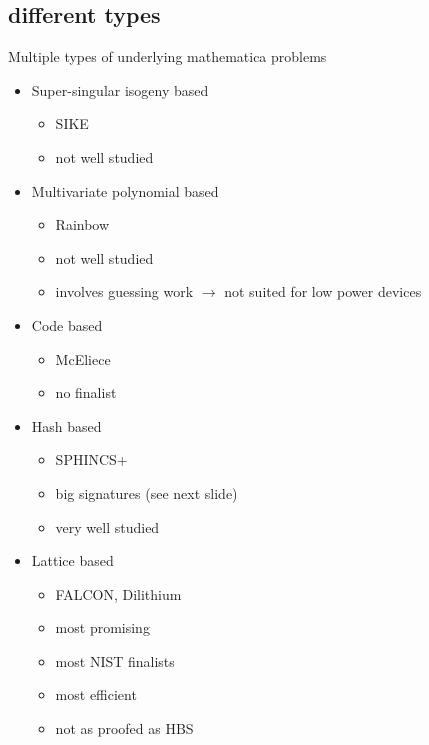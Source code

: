 \documentclass[ucs,10pt]{beamer}
\begin{document}
\subsection{different types}
\begin{frame}{Multiple types of underlying mathematica problems}

  \begin{itemize}
    \item Super-singular isogeny based
    \begin{itemize}
      \item SIKE
      \item not well studied
    \end{itemize}
    \item Multivariate polynomial based
    \begin{itemize}
      \item Rainbow
      \item not well studied
      \item involves guessing work $\rightarrow$ not suited for low power devices
    \end{itemize}
    \item Code based
    \begin{itemize}
      \item McEliece
      \item no finalist
    \end{itemize}
    \item Hash based
    \begin{itemize}
      \item SPHINCS+ 
      \item big signatures (see next slide)
      \item very well studied
    \end{itemize}
    \item Lattice based
    \begin{itemize}
      \item FALCON, Dilithium
      \item most promising
      \item most NIST finalists
      \item most efficient
      \item not as proofed as HBS
    \end{itemize}
  \end{itemize}
  
\end{frame}
\end{document}
